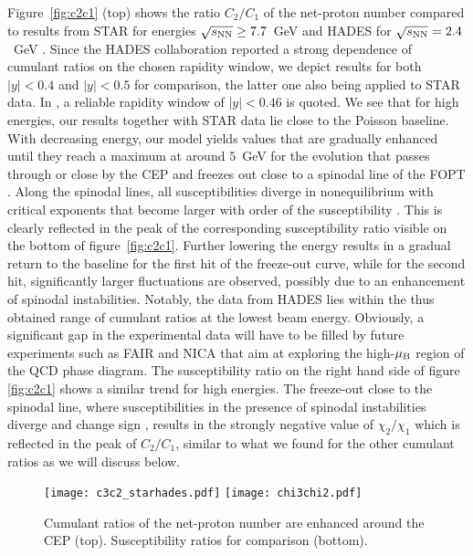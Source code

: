\documentclass[%
 reprint,
 amsmath,amssymb,
 aps,
]{revtex4-2}
\begin{document}
Figure~\ref{fig:c2c1} (top) shows the ratio $C_2/C_1$ of the net-proton number compared to results from STAR for energies $\sqrt{s_{\rm NN}}\ge 7.7$~GeV \cite{STAR:2021iop} and HADES for $\sqrt{s_{\rm NN}}= 2.4$~GeV \cite{HADES:2020wpc}. Since the HADES collaboration reported a strong dependence of cumulant ratios on the chosen rapidity window, we depict results for both $\lvert y\rvert<0.4$ and $\lvert y\rvert<0.5$ for comparison, the latter one also being applied to STAR data. In \cite{HADES:2020wpc}, a reliable rapidity window of $\lvert y\rvert<0.46$ is quoted. We see that for high energies, our results together with STAR data lie close to the Poisson baseline. With decreasing energy, our model yields values that are gradually enhanced until they reach a maximum at around $5$~GeV for the evolution that passes through or close by the CEP and freezes out close to a spinodal line of the FOPT \cite{Herold:2022tki}. Along the spinodal lines, all susceptibilities diverge in nonequilibrium with critical exponents that become larger with order of the susceptibility \cite{Sasaki:2007qh,Herold:2014zoa}. This is clearly reflected in the peak of the corresponding susceptibility ratio visible on the bottom of figure~\ref{fig:c2c1}. Further lowering the energy results in a gradual return to the baseline for the first hit of the freeze-out curve, while for the second hit, significantly larger fluctuations are observed, possibly due to an enhancement of spinodal instabilities. Notably, the data from HADES lies within the thus obtained range of cumulant ratios at the lowest beam energy. Obviously, a significant gap in the experimental data will have to be filled by future experiments such as FAIR and NICA that aim at exploring the high-$\mu_{\rm B}$ region of the QCD phase diagram. The susceptibility ratio on the right hand side of figure \ref{fig:c2c1} shows a similar trend for high energies. The freeze-out close to the spinodal line, where susceptibilities in the presence of spinodal instabilities diverge and change sign \cite{Sasaki:2007qh,Herold:2014zoa}, results in the strongly negative value of $\chi_2/\chi_1$ which is reflected in the peak of $C_2/C_1$, similar to what we found for the other cumulant ratios as we will discuss below. 

\begin{figure}[tbp]
\centering
\texttt{[image: c3c2\_starhades.pdf]}
\hfill
\texttt{[image: chi3chi2.pdf]}
\caption{Cumulant ratios of the net-proton number are enhanced around the CEP (top). Susceptibility ratios for comparison (bottom).}
\label{fig:c3c2}
\end{figure}
\end{document}
